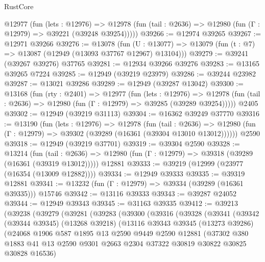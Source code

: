 \begin{lexlean}{RustCore}
\begin{coremodule}
    @12977
      (fun (lets : @12976) =>
      @12978 (fun (tail : @2636) => @12980 (fun (Γ : @12979) => @39221 (@39248 @39254)))))
@39266 := @12974 @39265
@39267 := @12971 @39266
@39276 := @13078
    (fun (U : @13077) => @13079 (fun (t : @7) => @13087 (@12949 (@13093 @37767 @12967) @13104)))
@39279 := @39241 (@39267 @39276) @37765
@39281 := @12934 @39266 @39276
@39283 := @13165 @39265 @7224
@39285 := @12949 (@39219 @23979)
@39286 := @39244 @23982
@39287 := @13021 @39286
@39289 := @12949 (@39287 @13042)
@39300 := @13168
    (fun (rty : @2401) =>
    @12977
      (fun (lets : @12976) =>
      @12978 (fun (tail : @2636) => @12980 (fun (Γ : @12979) => @39285 (@39289 @39254)))))
    @2405
@39302 := @12949 (@39219 @31113)
@39304 := @16362 @39249 @37770
@39316 := @13190
    (fun (lets : @12976) =>
    @12978
      (fun (tail : @2636) =>
      @12980 (fun (Γ : @12979) => @39302 (@39289 (@16361 (@39304 @13010 @13012))))))
    @2590
@39318 := @12949 (@39219 @37701)
@39319 := @39304 @2590
@39328 := @13214
    (fun (tail : @2636) => @12980 (fun (Γ : @12979) => @39318 (@39289 (@16361 (@39319 @13012)))))
    @12881
@39333 := @39219 (@12999 (@23977 (@16354 (@13009 @12882))))
@39334 := @12949 @39333
@39335 := @39319 @12881
@39341 := @13232 (fun (Γ : @12979) => @39334 (@39289 (@16361 @39335))) @15746
@39342 := @13116 @39333
@39343 := @39287 @24052
@39344 := @12949 @39343
@39345 := @31163 @39335
@39412 := @39213
    (@39238
      (@39279
        (@39281
          (@39283
            (@39300
              (@39316
                (@39328
                  (@39341
                    (@39342
                      (@39344 @39345)
                      (@13268 @39218)
                      (@13116
                        @39343
                        @39345
                        (@13273 @39286)
                        (@24068
                          @1906
                          @587
                          @1895
                          @13
                          @2590
                          @9449
                          @2590
                          @12881
                          (@37302
                            @380
                            @1883
                            @41
                            @13
                            @2590
                            @9301
                            @2663
                            @2304
                            @37322
                            @30819
                            @30822
                            @30825
                            @30828
                            @16536)

\end{coremodule}
\end{lexlean}
